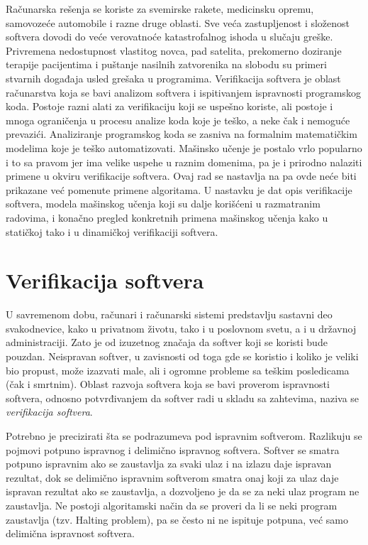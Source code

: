 \documentclass[a4paper]{article}
\begin{document}
Računarska rešenja se koriste za svemirske rakete, medicinsku opremu, samovozeće automobile i razne druge oblasti.
Sve veća zastupljenost i složenost softvera dovodi do veće verovatnoće katastrofalnog ishoda u slučaju greške.
Privremena nedostupnost vlastitog novca, pad satelita, prekomerno doziranje terapije pacijentima i puštanje nasilnih zatvorenika
na slobodu su primeri stvarnih događaja usled grešaka u programima.
Verifikacija softvera je oblast računarstva koja se bavi analizom softvera i ispitivanjem ispravnosti
programskog koda. Postoje razni alati za verifikaciju koji se uspešno koriste, ali postoje i mnoga ograničenja
u procesu analize koda koje je teško, a neke čak i nemoguće prevazići.
Analiziranje programskog koda se zasniva na formalnim matematičkim modelima koje je teško automatizovati.
Mašinsko učenje je postalo vrlo popularno i to sa pravom jer ima velike uspehe u raznim domenima,
pa je i prirodno nalaziti primene u okviru verifikacije softvera. Ovaj rad se nastavlja na \cite{micovic}
pa ovde neće biti prikazane već pomenute primene algoritama. U nastavku je dat opis verifikacije softvera,
modela mašinskog učenja koji su dalje korišćeni u razmatranim radovima, i konačno pregled konkretnih
primena mašinskog učenja kako u statičkoj tako i u dinamičkoj verifikaciji softvera.



\section{Verifikacija softvera}
\label{sec:verifikacija}



\par U savremenom dobu, računari i računarski sistemi predstavlju sastavni deo svakodnevice, kako u privatnom životu, tako i u poslovnom svetu, a i u državnoj administraciji. Zato je od izuzetnog značaja da softver koji se koristi bude pouzdan. Neispravan softver, u zavisnosti od toga gde se koristio i koliko je veliki bio propust, može izazvati male, ali i ogromne probleme sa teškim posledicama (čak i smrtnim). Oblast razvoja softvera koja se bavi proverom ispravnosti softvera, odnosno potvrđivanjem da softver radi u skladu sa zahtevima, naziva se \emph{verifikacija softvera}.

\par Potrebno je precizirati šta se podrazumeva pod ispravnim softverom. Razlikuju se pojmovi potpuno ispravnog i delimično ispravnog softvera. Softver se smatra potpuno ispravnim ako se zaustavlja za svaki ulaz i na izlazu daje ispravan rezultat, dok se delimično ispravnim softverom smatra onaj koji za ulaz daje ispravan rezultat ako se zaustavlja, a dozvoljeno je da se za neki ulaz program ne zaustavlja. Ne postoji algoritamski način da se proveri da li se neki program zaustavlja (tzv. Halting problem), pa se često ni ne ispituje potpuna, već samo delimična ispravnost softvera.
\end{document}
